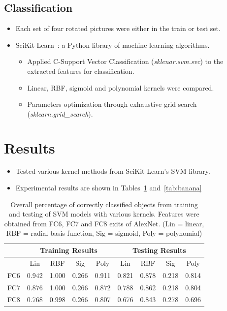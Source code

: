 \documentclass{article} %
\begin{document}
\subsection{Classification}
 \begin{itemize}
  \item Each set of four rotated pictures were either in the train or test set. 
  \item SciKit Learn~\citep{scikit-learn}: a Python library of machine learning algorithms. 
 \begin{itemize}
 \item Applied C-Support Vector Classification (\emph{sklenar.svm.svc}) to the extracted features for classification. 
 \item Linear, RBF, sigmoid and polynomial kernels were compared. 
 \item Parameters optimization through exhaustive grid search (\emph{sklearn.grid\_search}).
 \end{itemize}
 \end{itemize}
 
 \section{Results}
 \label{sec:results}
\begin{itemize}
\item Tested various kernel methods from SciKit Learn's SVM library.
\item Experimental results are shown in Tables~\ref{tab:core} and~\ref{tab:banana}
\end{itemize}
\begin{table}[h]
\caption{Overall percentage of correctly classified objects from training and testing of SVM models with various kernels. Features were obtained from FC6, FC7 and FC8 exits of AlexNet. (Lin = linear, RBF = radial basis function, Sig = sigmoid, Poly = polynomial)}
\label{tab:core}
\centering
\begin{tabular}{|c|c|c|c|c|c|c|c|c|}\hline
 &  \multicolumn{4}{c|}{Training Results} & \multicolumn{4}{c|}{Testing Results}\\\hline
&Lin& RBF&Sig&Poly&Lin& RBF&Sig&Poly\\\hline
FC6&0.942&1.000&0.266&0.911&0.821&0.878&0.218&0.814\\\hline
FC7&0.876&1.000&0.266&0.872&0.788&0.862&0.218&0.804\\\hline
FC8&0.768&0.998&0.266&0.807&0.676&0.843&0.278&0.696\\\hline
\end{tabular}
\end{table}
\end{document}
